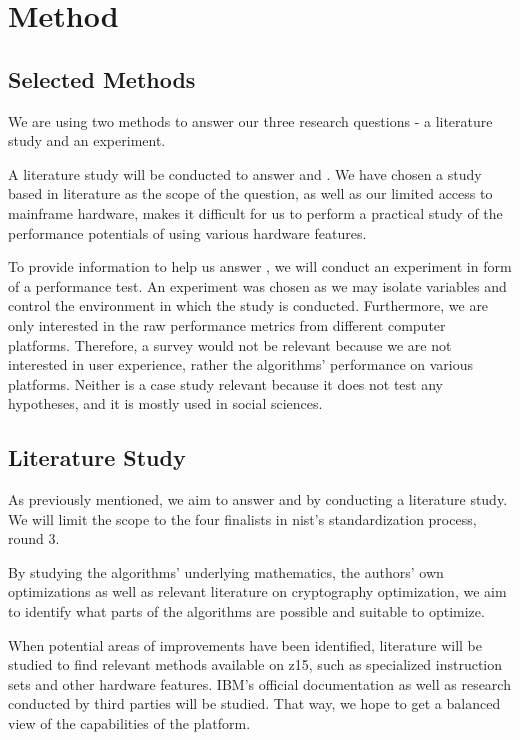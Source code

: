 \chapter{Method}
\label{chapter:method}

\section{Selected Methods}
\label{section:method:selected-method}

We are using two methods to answer our three research questions - a literature study and an experiment.

A literature study will be conducted to answer  and . We have chosen a study based in literature as the scope of the question, as well as our limited access to mainframe hardware, makes it difficult for us to perform a practical study of the performance potentials of using various hardware features.

To provide information to help us answer , we will conduct an experiment in form of a performance test. An experiment was chosen as we may isolate variables and control the environment in which the study is conducted. Furthermore, we are only interested in the raw performance metrics from different computer platforms. Therefore, a survey would not be relevant because we are not interested in user experience, rather the algorithms' performance on various platforms. Neither is a case study relevant because it does not test any hypotheses, and it is mostly used in social sciences\cite{wohlin2012}.

\section{Literature Study}
\label{section:method:literature-study}

As previously mentioned, we aim to answer  and  by conducting a literature study. We will limit the scope to the four finalists in \gls{nist}'s standardization process, round 3.

By studying the algorithms' underlying mathematics, the authors' own optimizations as well as relevant literature on cryptography optimization, we aim to identify what parts of the algorithms are possible and suitable to optimize.

When potential areas of improvements have been identified, literature will be studied to find relevant methods available on \gls{z15}, such as specialized instruction sets and other hardware features. IBM's official documentation as well as research conducted by third parties will be studied. That way, we hope to get a balanced view of the capabilities of the platform.

